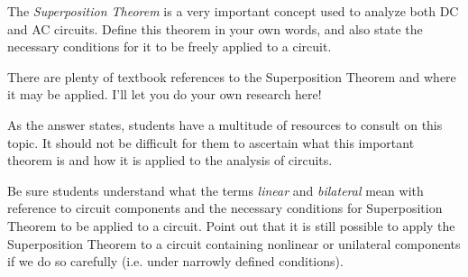 

The {\it Superposition Theorem} is a very important concept used to analyze both DC and AC circuits.  Define this theorem in your own words, and also state the necessary conditions for it to be freely applied to a circuit.







There are plenty of textbook references to the Superposition Theorem and where it may be applied.  I'll let you do your own research here!







As the answer states, students have a multitude of resources to consult on this topic.  It should not be difficult for them to ascertain what this important theorem is and how it is applied to the analysis of circuits.

Be sure students understand what the terms {\it linear} and {\it bilateral} mean with reference to circuit components and the necessary conditions for Superposition Theorem to be applied to a circuit.  Point out that it is still possible to apply the Superposition Theorem to a circuit containing nonlinear or unilateral components if we do so carefully (i.e. under narrowly defined conditions).





